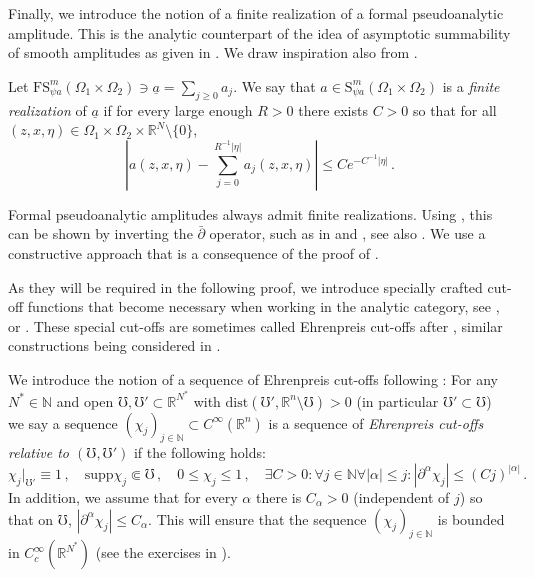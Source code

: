 \documentclass[
	fontsize=11pt, 
	twoside=false, 
	abstract=true, 
	a4paper,
]{scrartcl}
\newcommand{\sem}{\setminus\{0\}}
\newcommand{\RR}{\mathbb{R}}
\newcommand{\abs}[1]{\left\lvert#1\right\rvert}
\newcommand{\del}{\partial}
\newcommand{\supp}{\mathrm{supp}}
\newcommand{\dist}{\mathrm{dist}}
\newcommand{\ud}[1]{\underline{#1}}
\begin{document}
Finally, we introduce the notion of a finite realization of a formal pseudoanalytic amplitude. This is the analytic counterpart of the idea of asymptotic summability of smooth amplitudes as given in \cite[Prop.~1.1.9]{FIO1}. We draw inspiration also from \cite{bonthonneau2020fbi}. 
 
\begin{definition}\label{def:finitereaz}
	Let $\mathrm{FS}^m_{\psi a}(\Omega_1\times\Omega_2) \ni \ud{a} =\sum_{j\geq 0}a_j$. We say that $a \in \mathrm{S}^m_{\psi a}(\Omega_1\times\Omega_2)$ is a \emph{finite realization} of $\ud{a}$ if for every large enough $R>0$ there exists $C>0$ so that for all $(z,x,\eta)\in \Omega_1\times\Omega_2\times\RR^N\sem$,
	\begin{equation*}%
		\abs{a(z,x,\eta) - \sum_{j=0}^{R^{-1}\abs{\eta}} a_j(z,x,\eta)} \leq Ce^{-C^{-1}\abs{\eta}}\,.
	\end{equation*}
\end{definition}

Formal pseudoanalytic amplitudes always admit finite realizations. Using \cite{zbMATH03254277}, this can be shown %
by inverting the $\bar\del$ operator, such as in \cite{bonthonneau2020fbi} and \cite{AST_1982__95__R3_0}, see also \cite[Appx.]{MR1445350}. We use a constructive approach that is a consequence of the proof of \cite[Prop.~17.2.5]{MR4436039}. 

As they will be required in the following proof, we introduce specially crafted cut-off functions that become necessary when working in the analytic category, see \cite{MR0331124}, \cite[\S~8.4]{hoermander1} or \cite{MR4436039}. These special cut-offs are sometimes called Ehrenpreis cut-offs after \cite{zbMATH03159735}, similar constructions being considered in \cite{MR6354}.%

We introduce the notion of a sequence of Ehrenpreis cut-offs following \cite[Def.~3.2.2]{MR4436039}: For any $N^\ast \in \mathbb{N}$ and open $\mho, \mho' \subset \RR^{N^\ast}$ with $\dist(\mho',\RR^n\setminus\mho)> 0$ (in particular $\mho' \subset \mho$) we say a sequence $(\chi_{j})_{j\in\mathbb{N}} \subset C^\infty(\RR^n)$ is a sequence of \emph{Ehrenpreis cut-offs relative to $(\mho,\mho')$} if the following holds:
\begin{equation}\label{eq:ehre}
	\chi_{j}\vert_{\mho'} \equiv 1\,,\quad \supp \chi_{j}\Subset \mho\,, \quad 0\leq \chi_j\leq 1\,,\quad \exists C> 0\colon\forall j\in\mathbb{N}\forall\abs{\alpha}\leq j\colon \abs{\del^\alpha \chi_{j}} \leq (Cj)^{\abs{\alpha}}\,.
\end{equation}
In addition, we assume that for every $\alpha$ there is $C_\alpha>0$ (independent of $j$) so that on $\mho$, $\abs{\del^\alpha \chi_j} \leq C_\alpha$. This will ensure that the sequence $(\chi_j)_{j\in\mathbb{N}}$ is bounded in $C_c^\infty(\RR^{N^\ast})$ (see the exercises in \cite[Chpt.~14]{zbMATH05162168}).
\end{document}

